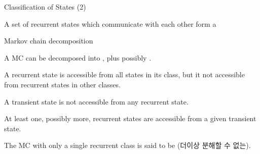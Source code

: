 \begin{frame}{Classification of States (2)}

{
\small
\plitemsep 0.05in
\bci

\item A set of recurrent states which communicate with each other form a 

\item<2-> Markov chain decomposition
\bci
\plitemsep 0.05in
\item<2-> A MC can be decomposed into , plus possibly .
\item<3-> A recurrent state is accessible from all states in its class, but it not accessible from recurrent states in other classes.
\item<4-> A transient state is not accessible from any recurrent state.
\item<5-> At least one, possibly more, recurrent states are accessible from a given transient state. 
\eci 

\item<6-> The MC with only a single recurrent class is said to be  (더이상 분해할 수 없는).

\eci
}
{
\begin{center}
\end{center}
}

\end{frame}


